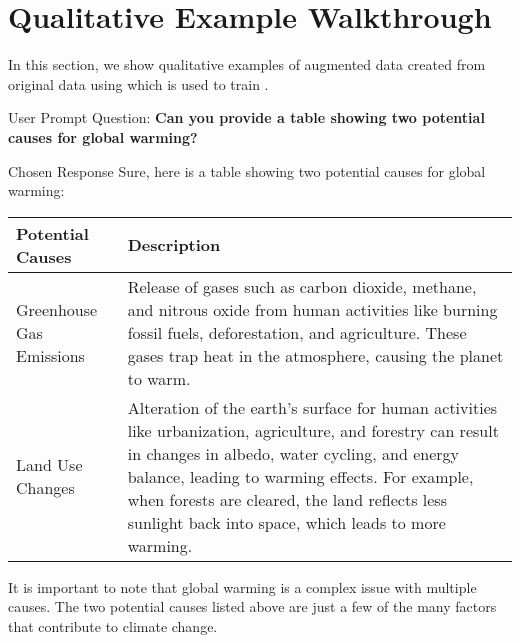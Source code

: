 \vspace{-0.6in}
\section{Qualitative Example Walkthrough} 
\label{sec:qualitative_example_walkthrough}

In this section, we show qualitative examples of augmented data created from original data using which is used to train \carma{}.

\begin{promptbox}{User Prompt}
Question: \textbf{Can you provide a table showing two potential causes for global warming?}


\end{promptbox}

\begin{promptbox}{Chosen Response}
Sure, here is a table showing two potential causes for global warming:
\vspace{0.15in}
\begin{center}
\begin{tabular}{|p{}|p{}|}
\hline
\textbf{Potential Causes} & \textbf{Description}\\\hline
Greenhouse Gas Emissions &
Release of gases such as carbon dioxide, methane, and nitrous oxide from human activities like burning fossil fuels, deforestation, and agriculture. These gases trap heat in the atmosphere, causing the planet to warm.\\\hline
Land Use Changes &
Alteration of the earth's surface for human activities like urbanization, agriculture, and forestry can result in changes in albedo, water cycling, and energy balance, leading to warming effects. For example, when forests are cleared, the land reflects less sunlight back into space, which leads to more warming.\\\hline
\end{tabular}
\end{center}

It is important to note that global warming is a complex issue with multiple causes. The two potential causes listed above are just a few of the many factors that contribute to climate change.
\end{promptbox}

